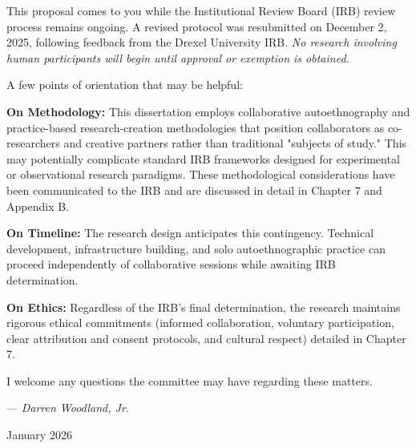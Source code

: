
This proposal comes to you while the Institutional Review Board (IRB) review process remains ongoing. A revised protocol was resubmitted on December 2, 2025, following feedback from the Drexel University IRB. \textit{No research involving human participants will begin until approval or exemption is obtained.}

A few points of orientation that may be helpful:

\textbf{On Methodology:} This dissertation employs collaborative autoethnography and practice-based research-creation methodologies that position collaborators as co-researchers and creative partners rather than traditional "subjects of study." This may potentially complicate standard IRB frameworks designed for experimental or observational research paradigms. These methodological considerations have been communicated to the IRB and are discussed in detail in Chapter 7 and Appendix B.

\textbf{On Timeline:} The research design anticipates this contingency. Technical development, infrastructure building, and solo autoethnographic practice can proceed independently of collaborative sessions while awaiting IRB determination.

\textbf{On Ethics:} Regardless of the IRB's final determination, the research maintains rigorous ethical commitments (informed collaboration, voluntary participation, clear attribution and consent protocols, and cultural respect) detailed in Chapter 7.

I welcome any questions the committee may have regarding these matters.

 \vspace{1.0em}
—\textit{ Darren Woodland, Jr.}

 \vspace{0.25em}
January 2026